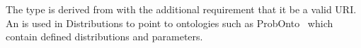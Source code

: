 \documentclass[draftspec]{sbmlpkgspec}
\newcommand{\fixttspace}{\hspace*{1pt}}
\newcommand{\sbmlthreecore}{SBML Level~3 Core\xspace}
\newcommand{\threeone}{SBML Level~3 Version~1\xspace}
\newcommand{\distrib}{Distributions\xspace}
\begin{document}
The type  is derived from  with the additional requirement that it be a valid URI.  An  is used in \distrib to point to ontologies such as ProbOnto~\citep{swat:2016} which contain defined distributions and parameters. 







\end{document}
